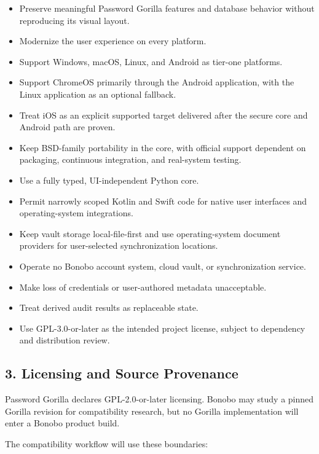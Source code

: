 \documentclass[
  letterpaper,
]{article}
\providecommand{\tightlist}{%
  \setlength{\itemsep}{0pt}\setlength{\parskip}{0pt}}
\begin{document}
\begin{itemize}
\tightlist
\item
  Preserve meaningful Password Gorilla features and database behavior without reproducing its visual layout.
\item
  Modernize the user experience on every platform.
\item
  Support Windows, macOS, Linux, and Android as tier-one platforms.
\item
  Support ChromeOS primarily through the Android application, with the Linux application as an optional fallback.
\item
  Treat iOS as an explicit supported target delivered after the secure core and Android path are proven.
\item
  Keep BSD-family portability in the core, with official support dependent on packaging, continuous integration, and
  real-system testing.
\item
  Use a fully typed, UI-independent Python core.
\item
  Permit narrowly scoped Kotlin and Swift code for native user interfaces and operating-system integrations.
\item
  Keep vault storage local-file-first and use operating-system document providers for user-selected synchronization
  locations.
\item
  Operate no Bonobo account system, cloud vault, or synchronization service.
\item
  Make loss of credentials or user-authored metadata unacceptable.
\item
  Treat derived audit results as replaceable state.
\item
  Use GPL-3.0-or-later as the intended project license, subject to dependency and distribution review.
\end{itemize}

\subsection{3. Licensing and Source Provenance}\label{3-licensing-and-source-provenance}

Password Gorilla declares GPL-2.0-or-later licensing. Bonobo may study a pinned Gorilla revision for compatibility
research, but no Gorilla implementation will enter a Bonobo product build.

The compatibility workflow will use these boundaries:
\end{document}
